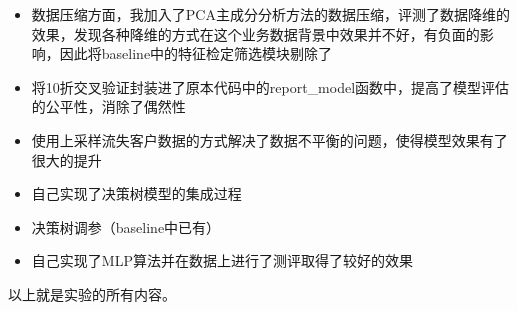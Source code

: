 \documentclass{article}
\begin{document}
\begin{itemize}
	\item 数据压缩方面，我加入了PCA主成分分析方法的数据压缩，评测了数据降维的效果，发现各种降维的方式在这个业务数据背景中效果并不好，有负面的影响，因此将baseline中的特征检定筛选模块剔除了
	\item 将10折交叉验证封装进了原本代码中的report\_model函数中，提高了模型评估的公平性，消除了偶然性
	\item 使用上采样流失客户数据的方式解决了数据不平衡的问题，使得模型效果有了很大的提升
	\item 自己实现了决策树模型的集成过程
	\item 决策树调参（baseline中已有）
	\item 自己实现了MLP算法并在数据上进行了测评取得了较好的效果
\end{itemize}

以上就是实验的所有内容。

  
\end{document}
